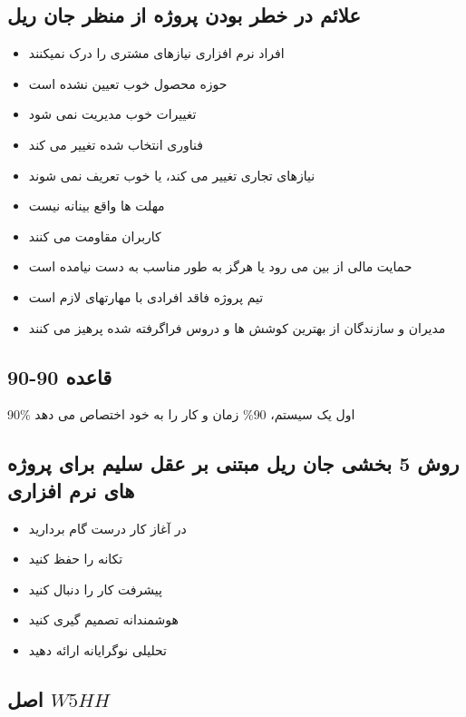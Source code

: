 \documentclass{article}
\begin{document}
\newpage

\subsection{علائم در خطر بودن پروژه از منظر جان ریل}


\begin{itemize}
	\item افراد نرم افزاری نیازهای مشتری را درک نمیکنند
	\item حوزه محصول خوب تعیین نشده است
	\item تغییرات خوب مدیریت نمی شود
	\item فناوری انتخاب شده تغییر می کند
	\item نیازهای تجاری تغییر می کند، یا خوب تعریف نمی شوند
	\item مهلت ها واقع بینانه نیست
	\item کاربران مقاومت می کنند
	\item حمایت مالی از بین می رود یا هرگز به طور مناسب به دست نیامده است
	\item تیم پروژه فاقد افرادی با مهارتهای لازم است
	\item مدیران و سازندگان از بهترین کوشش ها و دروس فراگرفته شده پرهیز می کنند
\end{itemize}



\subsection{قاعده 90-90}
90\% اول یک سیستم، 90\% زمان و کار را به خود اختصاص می دهد 


\subsection{روش 5 بخشی جان ریل مبتنی بر عقل سلیم برای پروژه های نرم افزاری}

\begin{itemize}
	\item در آغاز کار درست گام بردارید
	\item تکانه را حفظ کنید
	\item پیشرفت کار را دنبال کنید
	\item هوشمندانه تصمیم گیری کنید
	\item تحلیلی نوگرایانه ارائه دهید
\end{itemize}


\newpage


\subsection{اصل $W5HH$}
\end{document}
